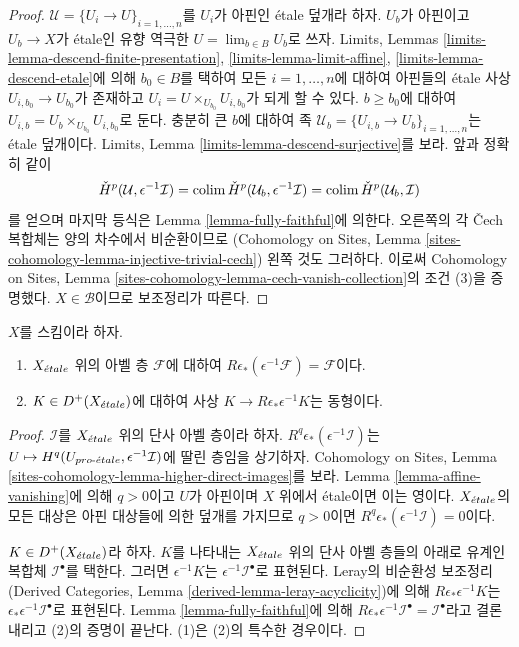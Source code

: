 \begin{proof}
\medskip\noindent
$\mathcal{U} = \{U_i \to U\}_{i = 1, \ldots, n}$를 $U_i$가 아핀인
\'etale 덮개라 하자. $U_b$가 아핀이고 $U_b \to X$가 \'etale인 유향
역극한 $U = \lim_{b \in B} U_b$로 쓰자. Limits, Lemmas
\ref{limits-lemma-descend-finite-presentation},
\ref{limits-lemma-limit-affine}, \ref{limits-lemma-descend-etale}에 의해
$b_0 \in B$를 택하여 모든 $i = 1, \ldots, n$에 대하여 아핀들의
\'etale 사상 $U_{i, b_0} \to U_{b_0}$가 존재하고
$U_i = U \times_{U_{b_0}} U_{i, b_0}$가 되게 할 수 있다.
$b \geq b_0$에 대하여
$U_{i, b} = U_b \times_{U_{b_0}} U_{i, b_0}$로 둔다.
충분히 큰 $b$에 대하여 족
$\mathcal{U}_b = \{U_{i, b} \to U_b\}_{i = 1, \ldots, n}$는
\'etale 덮개이다. Limits, Lemma
\ref{limits-lemma-descend-surjective}를 보라. 앞과 정확히 같이
$$
\check{H}^p(\mathcal{U}, \epsilon^{-1}\mathcal{I}) =
\mathop{\mathrm{colim}}\nolimits \check{H}^p(\mathcal{U}_b, \epsilon^{-1}\mathcal{I}) =
\mathop{\mathrm{colim}}\nolimits \check{H}^p(\mathcal{U}_b, \mathcal{I})
$$
를 얻으며 마지막 등식은 Lemma \ref{lemma-fully-faithful}에 의한다.
오른쪽의 각 \v{C}ech 복합체는 양의 차수에서 비순환이므로
(Cohomology on Sites, Lemma
\ref{sites-cohomology-lemma-injective-trivial-cech}) 왼쪽 것도 그러하다.
이로써 Cohomology on Sites, Lemma
\ref{sites-cohomology-lemma-cech-vanish-collection}의 조건 (3)을
증명했다. $X \in \mathcal{B}$이므로 보조정리가 따른다.
\end{proof}

\begin{lemma}
\label{lemma-relative-comparison}
$X$를 스킴이라 하자.
\begin{enumerate}
\item $X_{\acute{e}tale}$ 위의 아벨 층 $\mathcal{F}$에 대하여
$R\epsilon_*(\epsilon^{-1}\mathcal{F}) = \mathcal{F}$이다.
\item $K \in D^+(X_{\acute{e}tale})$에 대하여 사상
$K \to R\epsilon_*\epsilon^{-1}K$는 동형이다.
\end{enumerate}
\end{lemma}

\begin{proof}
$\mathcal{I}$를 $X_{\acute{e}tale}$ 위의 단사 아벨 층이라 하자.
$R^q\epsilon_*(\epsilon^{-1}\mathcal{I})$는
$U \mapsto H^q(U_{pro\text{-}\acute{e}tale}, \epsilon^{-1}\mathcal{I})$에 딸린 층임을
상기하자. Cohomology on Sites, Lemma
\ref{sites-cohomology-lemma-higher-direct-images}를 보라.
Lemma \ref{lemma-affine-vanishing}에 의해 $q > 0$이고 $U$가 아핀이며
$X$ 위에서 \'etale이면 이는 영이다. $X_{\acute{e}tale}$의 모든 대상은 아핀
대상들에 의한 덮개를 가지므로
$q > 0$이면 $R^q\epsilon_*(\epsilon^{-1}\mathcal{I}) = 0$이다.

\medskip\noindent
$K \in D^+(X_{\acute{e}tale})$라 하자. $K$를 나타내는 $X_{\acute{e}tale}$ 위의 단사
아벨 층들의 아래로 유계인 복합체 $\mathcal{I}^\bullet$를 택한다.
그러면 $\epsilon^{-1}K$는 $\epsilon^{-1}\mathcal{I}^\bullet$로
표현된다. Leray의 비순환성 보조정리(Derived Categories, Lemma
\ref{derived-lemma-leray-acyclicity})에 의해
$R\epsilon_*\epsilon^{-1}K$는
$\epsilon_*\epsilon^{-1}\mathcal{I}^\bullet$로 표현된다.
Lemma \ref{lemma-fully-faithful}에 의해
$R\epsilon_*\epsilon^{-1}\mathcal{I}^\bullet = \mathcal{I}^\bullet$라고
결론내리고 (2)의 증명이 끝난다. (1)은 (2)의 특수한 경우이다.
\end{proof}

